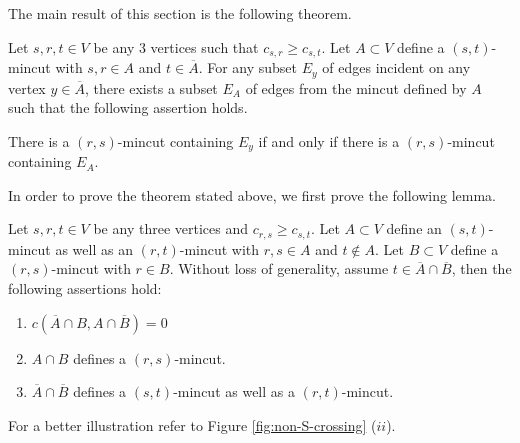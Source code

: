 
The main result of this section is the following theorem.


\begin{theorem}
Let $s,r,t\in V$ be any 3 vertices such that $c_{s,r}\ge c_{s,t}$. Let $A\subset V$ define a $(s,t)$-mincut with  $s,r\in A$ and $t\in \overline{A}$. For any subset $E_y$ of edges incident on any vertex $y\in \overline{A}$, there exists a subset $E_A$ of edges from the mincut defined by $A$ such that the following assertion holds.

There is a $(r,s)$-mincut containing $E_y$ if and only if there is a $(r,s)$-mincut containing $E_A$. 
\label{thm:query-transform}
\end{theorem}


\noindent
In order to prove the theorem stated above, we first prove the following lemma.

\begin{lemma}
Let $s,r,t \in V$ be any three vertices and $c_{r,s} \ge c_{s,t}$. Let $A\subset V$ define an $(s,t)$-mincut as well as
an $(r,t)$-mincut
with $r,s\in A$ and $t\notin A$. Let $B\subset V$ define a $(r,s)$-mincut with $r\in B$. Without loss of generality, assume $t \in {\overline A}\cap {\overline B}$, then the following assertions hold:
\begin{enumerate}
\item
$c(\overline{A}\cap B, A\cap \overline{B})=0$
\item  $A\cap B$ defines a $(r,s)$-mincut.
\item  ${\overline A}\cap {\overline B}$ defines a $(s,t)$-mincut as well as a $(r,t)$-mincut.
\end{enumerate}

For a better illustration refer to Figure \ref{fig:non-S-crossing} ($ii$).
\label{lem:3-vertex-lemma}
\end{lemma}


